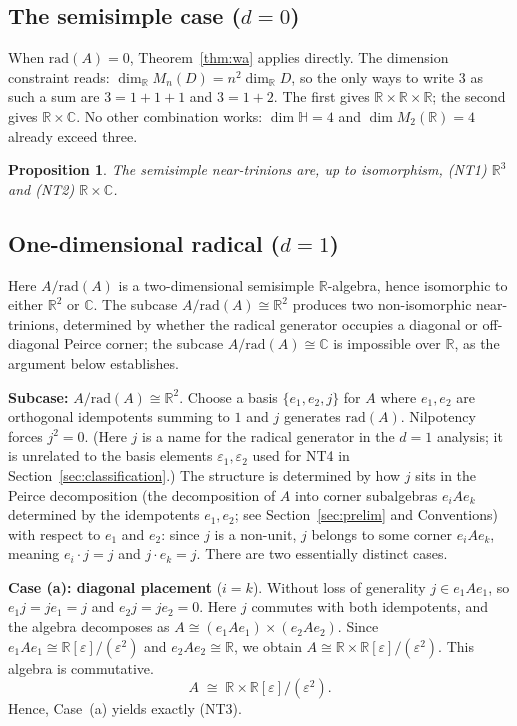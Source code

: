 \documentclass{amsart}
\theoremstyle{plain}
\newtheorem{proposition}[theorem]{Proposition}
\theoremstyle{definition}
\theoremstyle{remark}
\newcommand{\RR}{\mathbb{R}}
\newcommand{\CC}{\mathbb{C}}
\newcommand{\HH}{\mathbb{H}}
\newcommand{\Jac}{\mathrm{rad}}
\begin{document}
\subsection{The semisimple case (\texorpdfstring{$d=0$}{d=0})}

When $\Jac(A) = 0$, Theorem~\ref{thm:wa} applies directly.
The dimension constraint reads: $\dim_\RR M_n(D) = n^2 \dim_\RR D$, so
the only ways to write $3$ as such a sum are $3 = 1+1+1$ and $3 = 1+2$.
The first gives $\RR \times \RR \times \RR$; the second gives $\RR \times \CC$.
No other combination works: $\dim \HH = 4$ and $\dim M_2(\RR) = 4$
already exceed three.

\begin{proposition}\label{prop:ss}
  The semisimple near-trinions are, up to isomorphism,
  \textup{(NT1)} $\RR^3$ and \textup{(NT2)} $\RR \times \CC$.
\end{proposition}

\subsection{One-dimensional radical (\texorpdfstring{$d=1$}{d=1})}
\label{sec:d1}
Here $A/\Jac(A)$ is a two-dimensional semisimple $\RR$-algebra, 
hence isomorphic to either $\RR^2$ or $\CC$. The subcase 
$A/\Jac(A) \cong \RR^2$ produces two non-isomorphic near-trinions, 
determined by whether the radical generator occupies a diagonal or 
off-diagonal Peirce corner; the subcase $A/\Jac(A) \cong \CC$ is impossible over $\RR$,
as the argument below establishes.

\medskip
\noindent\textbf{Subcase:} $A/\Jac(A) \cong \RR^2$.
Choose a basis $\{e_1, e_2, j\}$ for $A$ where $e_1, e_2$ are
orthogonal idempotents summing to $1$ and $j$ generates $\Jac(A)$.
Nilpotency forces $j^2 = 0$.
(Here $j$ is a name for the radical generator in the $d=1$ analysis;
it is unrelated to the basis elements $\varepsilon_1, \varepsilon_2$ used for NT4 in
Section~\ref{sec:classification}.)
The structure is determined by how $j$ sits in the Peirce decomposition
(the decomposition of $A$ into corner subalgebras $e_i A e_k$ determined
by the idempotents $e_1, e_2$; see Section~\ref{sec:prelim} and
Conventions)
with respect to $e_1$ and $e_2$: since $j$ is a non-unit, $j$ belongs
to some corner $e_i A e_k$, meaning $e_i \cdot j = j$ and $j \cdot e_k = j$.
There are two essentially distinct cases.

\medskip
\noindent\textbf{Case (a): diagonal placement} ($i = k$).
Without loss of generality $j \in e_1 A e_1$, so $e_1 j = j e_1 = j$
and $e_2 j = j e_2 = 0$.
Here $j$ commutes with both idempotents, and the algebra decomposes as
$A \cong (e_1 A e_1) \times (e_2 A e_2)$.
Since $e_1 A e_1 \cong \RR[\varepsilon]/(\varepsilon^2)$ and
$e_2 A e_2 \cong \RR$, we obtain $A \cong \RR \times \RR[\varepsilon]/(\varepsilon^2)$.
This algebra is commutative.
\[
  \boxed{A \;\cong\; \RR \times \RR[\varepsilon]/(\varepsilon^2). \tag{NT3}}
\]
Hence, Case~(a) yields exactly \textup{(NT3)}.
\end{document}

